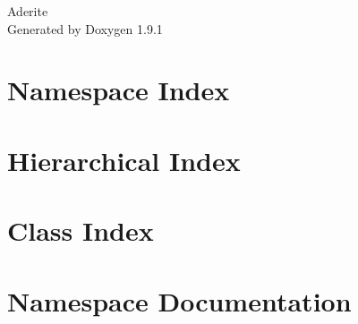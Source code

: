 \let\mypdfximage\pdfximage\def\pdfximage{\immediate\mypdfximage}\documentclass[twoside]{book}
\newcommand{\+}{\discretionary{\mbox{\scriptsize$\hookleftarrow$}}{}{}}
\newcommand{\clearemptydoublepage}{%
  \newpage{\pagestyle{empty}\cleardoublepage}%
}
\begin{document}
\raggedbottom

\hypersetup{pageanchor=false,
             bookmarksnumbered=true,
             pdfencoding=unicode
            }
\begin{titlepage}
\vspace*{7cm}
\begin{center}%
{\Large Aderite }\\
\vspace*{1cm}
{\large Generated by Doxygen 1.9.1}\\
\end{center}
\end{titlepage}
\clearemptydoublepage
{}
\tableofcontents
\clearemptydoublepage
{}
\hypersetup{pageanchor=true}

\chapter{Namespace Index}

\chapter{Hierarchical Index}

\chapter{Class Index}

\chapter{Namespace Documentation}

\end{document}
